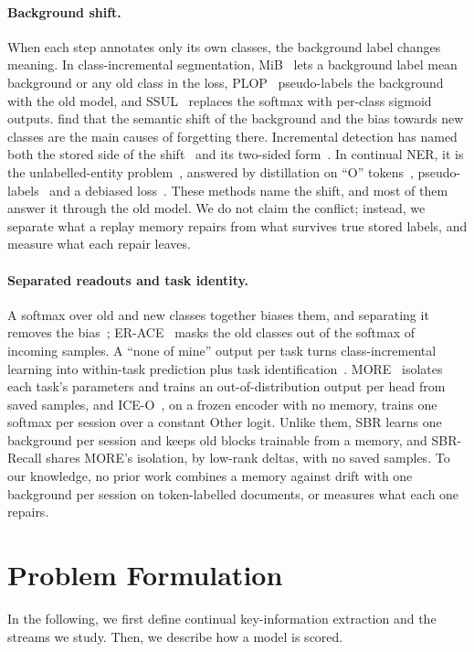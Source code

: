 \documentclass[10pt,twocolumn,letterpaper]{article}
\begin{document}
\paragraph{Background shift.} When each step annotates only its own classes, the background label changes meaning. In class-incremental segmentation, MiB~\citep{cermelli2020mib} lets a background label mean background or any old class in the loss, PLOP~\citep{douillard2021plop} pseudo-labels the background with the old model, and SSUL~\citep{cha2021ssul} replaces the softmax with per-class sigmoid outputs. \citet{kalb2022causes} find that the semantic shift of the background and the bias towards new classes are the main causes of forgetting there. Incremental detection has named both the stored side of the shift~\citep{liu2023abr} and its two-sided form~\citep{mo2024bpf}. In continual NER, it is the unlabelled-entity problem~\citep{ma2023learning}, answered by distillation on ``O'' tokens~\citep{monaikul2021extendner,zheng2022cfner}, pseudo-labels~\citep{zhang2023cpfd} and a debiased loss~\citep{qiu2024is3}. These methods name the shift, and most of them answer it through the old model. We do not claim the conflict; instead, we separate what a replay memory repairs from what survives true stored labels, and measure what each repair leaves.

\paragraph{Separated readouts and task identity.} A softmax over old and new classes together biases them, and separating it removes the bias~\citep{ahn2021ssil}; ER-ACE~\citep{caccia2022erace} masks the old classes out of the softmax of incoming samples. A ``none of mine'' output per task turns class-incremental learning into within-task prediction plus task identification~\citep{kim2022theoretical}. MORE~\citep{kim2022more} isolates each task's parameters and trains an out-of-distribution output per head from saved samples, and ICE-O~\citep{liu2023ice}, on a frozen encoder with no memory, trains one softmax per session over a constant Other logit. Unlike them, SBR learns one background per session and keeps old blocks trainable from a memory, and SBR-Recall shares MORE's isolation, by low-rank deltas, with no saved samples. To our knowledge, no prior work combines a memory against drift with one background per session on token-labelled documents, or measures what each one repairs.

\section{Problem Formulation}
\label{sec:setup}
In the following, we first define continual key-information extraction and the streams we study. Then, we describe how a model is scored.
\end{document}
